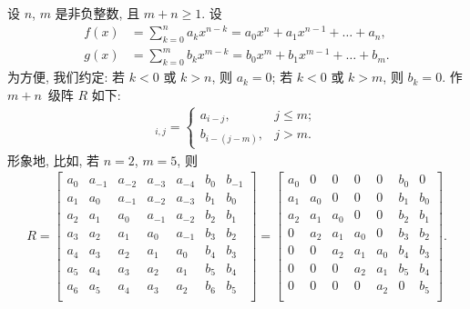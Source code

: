 \begin{example}
    设 \(n\), \(m\) 是非负整数,
    且 \(m + n \geq 1\).
    设
    \begin{align*}
        f(x) &
        = \sum_{k = 0}^{n} {a_k x^{n-k}}
        = a_0 x^n + a_1 x^{n-1} + \dots + a_n,
        \\
        g(x) &
        = \sum_{k = 0}^{m} {b_k x^{m-k}}
        = b_0 x^m + b_1 x^{m-1} + \dots + b_m.
    \end{align*}
    为方便, 我们约定:
    若 \(k < 0\) 或 \(k > n\), 则 \(a_k = 0\);
    若 \(k < 0\) 或 \(k > m\), 则 \(b_k = 0\).
    作 \(m + n\)~级阵 \(R\) 如下:
    \begin{align*}
        [R]_{i,j}
        = \begin{cases}
              a_{i-j},     & j \leq m; \\
              b_{i-(j-m)}, & j > m.
          \end{cases}
    \end{align*}
    形象地, 比如, 若 \(n = 2\), \(m = 5\), 则
    \begin{align*}
        R
        =
        \begin{bmatrix}
            a_{0} & a_{-1} & a_{-2} & a_{-3} & a_{-4} & b_{0} & b_{-1} \\
            a_{1} & a_{0}  & a_{-1} & a_{-2} & a_{-3} & b_{1} & b_{0}  \\
            a_{2} & a_{1}  & a_{0}  & a_{-1} & a_{-2} & b_{2} & b_{1}  \\
            a_{3} & a_{2}  & a_{1}  & a_{0}  & a_{-1} & b_{3} & b_{2}  \\
            a_{4} & a_{3}  & a_{2}  & a_{1}  & a_{0}  & b_{4} & b_{3}  \\
            a_{5} & a_{4}  & a_{3}  & a_{2}  & a_{1}  & b_{5} & b_{4}  \\
            a_{6} & a_{5}  & a_{4}  & a_{3}  & a_{2}  & b_{6} & b_{5}  \\
        \end{bmatrix}
        =
        \begin{bmatrix}
            a_0 & 0   & 0   & 0   & 0   & b_0 & 0   \\
            a_1 & a_0 & 0   & 0   & 0   & b_1 & b_0 \\
            a_2 & a_1 & a_0 & 0   & 0   & b_2 & b_1 \\
            0   & a_2 & a_1 & a_0 & 0   & b_3 & b_2 \\
            0   & 0   & a_2 & a_1 & a_0 & b_4 & b_3 \\
            0   & 0   & 0   & a_2 & a_1 & b_5 & b_4 \\
            0   & 0   & 0   & 0   & a_2 & 0   & b_5 \\
        \end{bmatrix}.
    \end{align*}


\end{example}
